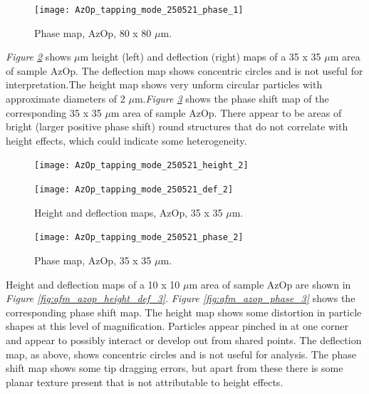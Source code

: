 \begin{figure}[H]
\centering
  \texttt{[image: AzOp\_tapping\_mode\_250521\_phase\_1]}
\caption[Phase map, AzOp]{Phase map, AzOp, 80 x 80 $\mu$m.}
\label{fig:afm_azop_phase_1}
\end{figure}

\textit{Figure \ref{fig:afm_azop_height_def_2}} shows $\mu$m height (left) and deflection (right) maps of a 35 x 35 $\mu$m area of sample AzOp. The deflection map shows concentric circles and is not useful for interpretation.The height map shows very unform circular particles with approximate diameters of 2 $\mu$m.\textit{Figure \ref{fig:afm_azop_phase_2}} shows the phase shift map of the corresponding 35 x 35 $\mu$m area of sample AzOp. There appear to be areas of bright (larger positive phase shift) round structures that do not correlate with height effects, which could indicate some heterogeneity.

\begin{figure}[H]
\centering
\begin{minipage}{.45\textwidth}
  \centering
  \texttt{[image: AzOp\_tapping\_mode\_250521\_height\_2]}
\end{minipage}
\begin{minipage}{.45\textwidth}
  \centering
  \texttt{[image: AzOp\_tapping\_mode\_250521\_def\_2]}
\end{minipage}
\caption[Height and deflection maps, AzOp]{Height and deflection maps, AzOp, 35 x 35 $\mu$m.}
\label{fig:afm_azop_height_def_2}
\end{figure}

\begin{figure}[H]
\centering
  \texttt{[image: AzOp\_tapping\_mode\_250521\_phase\_2]}
\caption[Phase map, AzOp]{Phase map, AzOp, 35 x 35 $\mu$m.}
\label{fig:afm_azop_phase_2}
\end{figure}

Height and deflection maps of a 10 x 10 $\mu$m area of sample AzOp are shown in \textit{Figure \ref{fig:afm_azop_height_def_3}}. \textit{Figure \ref{fig:afm_azop_phase_3}} shows the corresponding phase shift map. The height map shows some distortion in particle shapes at this level of magnification. Particles appear pinched in at one corner and appear to possibly interact or develop out from shared points. The deflection map, as above, shows concentric circles and is not useful for analysis. The phase shift map shows some tip dragging errors, but apart from these there is some planar texture present that is not attributable to height effects.

